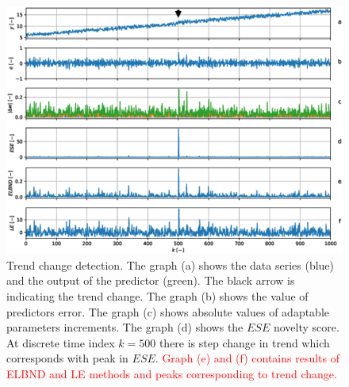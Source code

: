 \begin{figure}[h!]
    \centering
    \includegraphics[scale=0.64]{IMG/mdpi/trendchange.eps}
    \caption{Trend change detection. The graph (a) shows the data series (blue) and the  output of the predictor (green). The black arrow is indicating the trend change. The graph (b) shows the value of predictors error. The graph (c) shows  absolute values of adaptable parameters increments. The graph (d) shows the $ESE$ novelty score. At discrete time index $k=500$ there is step change in trend which corresponds with peak in $ESE$. \textcolor{red}{Graph (e) and (f) contains results of ELBND and LE methods and peaks corresponding to trend change.}}
    \label{fig:trend_change}
\end{figure}

